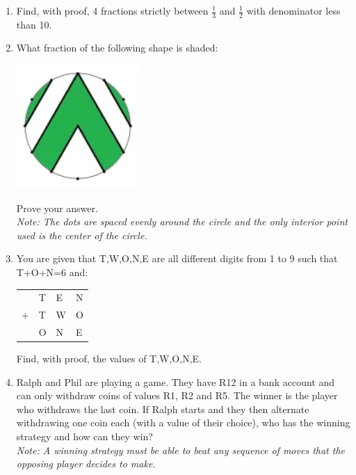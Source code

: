 \begin{enumerate}[1.]
\item Find, with proof, 4 fractions strictly between $\frac{1}{3}$ and $\frac{1}{2}$ with denominator less than 10. %


\item What fraction of the following shape is shaded:
	\begin{center}
	\includegraphics[scale=1.0]{beginner_test_1_img_1.png}	
	\end{center}
Prove your answer.\\
\textit{Note: The dots are spaced evenly around the circle and the only interior point used is the center of the circle.}


\item You are given that T,W,O,N,E are all different digits from 1 to 9 such that T+O+N=6 and:
\begin{center}
\begin{tabular}{m{1cm} m{0.5cm} m{0.5cm} m{0.5cm}}
&T&E&N\\
+&T&W&O\\
\hline
&O&N&E\\
\hline
\end{tabular}
\end{center}
Find, with proof, the values of T,W,O,N,E.


\item Ralph and Phil are playing a game. They have R12 in a bank account and can only withdraw coins of values R1, R2 and R5. The winner is the player who withdraws the last coin. If Ralph starts and they then alternate withdrawing one coin each (with a value of their choice), who has the winning strategy and how can they win?\\
\textit{Note: A winning strategy must be able to beat any sequence of moves that the opposing player decides to make.}



\end{enumerate}
